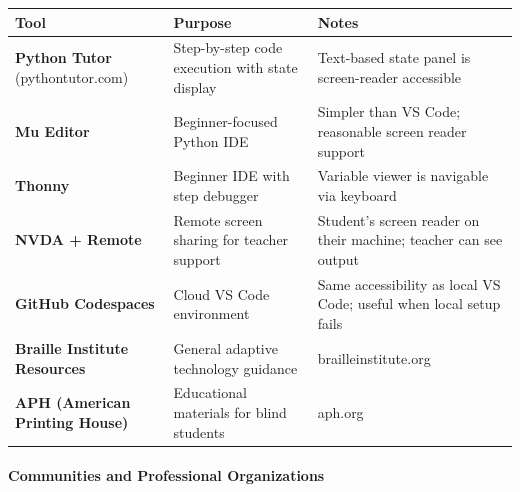 \documentclass[
  justified,
  openright,
]{tufte-book}
\let\subsubsection\paragraph
\let\paragraph\paragraph
\let\subsubsection\paragraph
\let\paragraph\paragraph
\begin{document}
{\def\LTcaptype{none} %
\begin{longtable}[]{@{}
  >{\raggedright\arraybackslash}p{}
  >{\raggedright\arraybackslash}p{}
  >{\raggedright\arraybackslash}p{}@{}}
\toprule\noalign{}
\begin{minipage}[b]{\linewidth}\raggedright
Tool
\end{minipage} & \begin{minipage}[b]{\linewidth}\raggedright
Purpose
\end{minipage} & \begin{minipage}[b]{\linewidth}\raggedright
Notes
\end{minipage} \\
\midrule\noalign{}
\endhead
\bottomrule\noalign{}
\endlastfoot
\textbf{Python Tutor} (pythontutor.com) & Step-by-step code execution
with state display & Text-based state panel is screen-reader
accessible \\
\textbf{Mu Editor} & Beginner-focused Python IDE & Simpler than VS Code;
reasonable screen reader support \\
\textbf{Thonny} & Beginner IDE with step debugger & Variable viewer is
navigable via keyboard \\
\textbf{NVDA + Remote} & Remote screen sharing for teacher support &
Student's screen reader on their machine; teacher can see output \\
\textbf{GitHub Codespaces} & Cloud VS Code environment & Same
accessibility as local VS Code; useful when local setup fails \\
\textbf{Braille Institute Resources} & General adaptive technology
guidance & brailleinstitute.org \\
\textbf{APH (American Printing House)} & Educational materials for blind
students & aph.org \\
\end{longtable}
}

\subsubsection{Communities and Professional
Organizations}\label{communities-and-professional-organizations}
\end{document}
